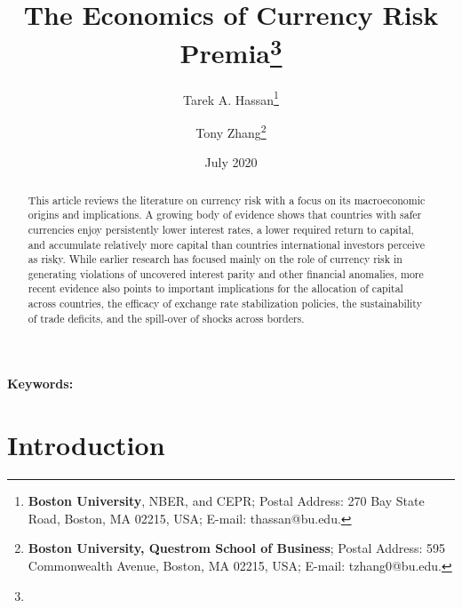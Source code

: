 \documentclass[12pt,letter]{article}
\theoremstyle{break} \theorembodyfont{\normalfont\itshape}
\theoremstyle{break}
\theoremstyle{break} \theorembodyfont{\normalfont\itshape}
\theoremstyle{break} \theorembodyfont{\normalfont\itshape}
\begin{document}
\author{Tarek A. Hassan\thanks{\textbf{Boston University}, NBER, and
    CEPR; Postal Address: 270 Bay State Road, Boston, MA 02215, USA;
    E-mail: thassan@bu.edu.} \and  Tony
  Zhang\thanks{\textbf{%
      Boston University, Questrom School of Business}; Postal Address:
    595 Commonwealth Avenue, Boston, MA 02215, USA; E-mail:
    tzhang0@bu.edu.} } \title{The Economics of Currency Risk Premia\thanks{}}
\date{ \bigskip July 2020}
\maketitle


\thispagestyle{empty}


\vspace{-0.7cm}





\begin{abstract}
This article reviews the literature on currency risk with a focus on its macroeconomic origins and implications. A growing body of evidence shows that countries with safer currencies enjoy persistently lower interest rates, a lower required return to capital, and accumulate relatively more capital than countries international investors perceive as risky. While earlier research has focused mainly on the role of currency risk in generating violations of uncovered interest parity and other financial anomalies, more recent evidence also points to important implications for the allocation of capital across countries, the efficacy of exchange rate stabilization policies, the sustainability of trade deficits, and the spill-over of shocks across borders.
\end{abstract}


\bigskip


{\noindent \textbf{Keywords:}  }

\pagebreak

 \setcounter{page}{1}


\section{Introduction}
\end{document}
